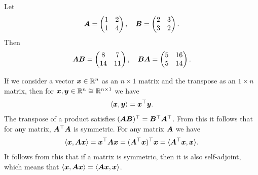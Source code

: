 \begin{example}
Let 
\begin{equation*}
\bm{A} = \begin{pmatrix}
 1 & 2\\
 1 & 4
 \end{pmatrix}, \quad
 \bm{B}=\begin{pmatrix}
 2 & 3\\
 3 & 2
 \end{pmatrix}.
 \end{equation*}
 Then
 \begin{equation*}
 \bm{A}\bm{B} = \begin{pmatrix}
8 & 7\\
14 & 11
\end{pmatrix}, \quad \bm{B}\bm{A} = \begin{pmatrix}
5 & 16\\
5 & 14
\end{pmatrix}.
\end{equation*}
\end{example}

If we consider a vector $\bm{x}\in \mathbb{R}^n$ as an $n\times 1$ matrix and the transpose as an $1\times n$ matrix, then for $\bm{x},\bm{y}\in \mathbb{R}^n\cong \mathbb{R}^{n\times 1}$ we have
\begin{equation*}
 \langle {\bm{x}}, {\bm{y}} \rangle = \bm{x}^{\top} \bm{y}.
\end{equation*}
The transpose of a product satisfies $(\bm{A}\bm{B})^{\top} = \bm{B}^{\top}\bm{A}^{\top}$. From this it follows that for any matrix, $\bm{A}^{\top}\bm{A}$ is symmetric. For any matrix $\bm{A}$ we have
\begin{equation*}
 \langle {\bm{x}}, {\bm{A}\bm{x}} \rangle = \bm{x}^{\top}\bm{A}\bm{x} = (\bm{A}^{\top}\bm{x})^{\top}\bm{x} = \langle {\bm{A}^{\top}\bm{x}}, {\bm{x}} \rangle.
\end{equation*}
It follows from this that if a matrix is symmetric, then it is also self-adjoint, which means that $\langle {\bm{x}}, {\bm{A}\bm{x}} \rangle = \langle {\bm{A}\bm{x}}, {\bm{x}} \rangle$.

